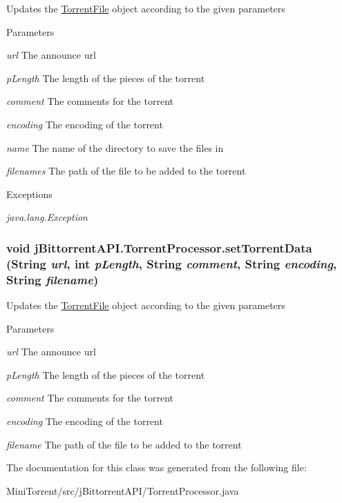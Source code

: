 \label{classj_bittorrent_a_p_i_1_1_torrent_processor_ae7e8114cb0d891424812ceac8fe62aad}
Updates the \hyperlink{classj_bittorrent_a_p_i_1_1_torrent_file}{TorrentFile} object according to the given parameters 
\begin{DoxyParams}{Parameters}
\item[{\em url}]The announce url \item[{\em pLength}]The length of the pieces of the torrent \item[{\em comment}]The comments for the torrent \item[{\em encoding}]The encoding of the torrent \item[{\em name}]The name of the directory to save the files in \item[{\em filenames}]The path of the file to be added to the torrent \end{DoxyParams}

\begin{DoxyExceptions}{Exceptions}
\item[{\em java.lang.Exception}]\end{DoxyExceptions}
\hypertarget{classj_bittorrent_a_p_i_1_1_torrent_processor_a4970e6a3aab640e0ac47cd6d65e749ee}{
\subsubsection[{setTorrentData}]{\setlength{\rightskip}{0pt plus 5cm}void jBittorrentAPI.TorrentProcessor.setTorrentData (String {\em url}, \/  int {\em pLength}, \/  String {\em comment}, \/  String {\em encoding}, \/  String {\em filename})}}
\label{classj_bittorrent_a_p_i_1_1_torrent_processor_a4970e6a3aab640e0ac47cd6d65e749ee}
Updates the \hyperlink{classj_bittorrent_a_p_i_1_1_torrent_file}{TorrentFile} object according to the given parameters 
\begin{DoxyParams}{Parameters}
\item[{\em url}]The announce url \item[{\em pLength}]The length of the pieces of the torrent \item[{\em comment}]The comments for the torrent \item[{\em encoding}]The encoding of the torrent \item[{\em filename}]The path of the file to be added to the torrent \end{DoxyParams}


The documentation for this class was generated from the following file:\begin{DoxyCompactItemize}
\item 
MiniTorrent/src/jBittorrentAPI/TorrentProcessor.java\end{DoxyCompactItemize}
